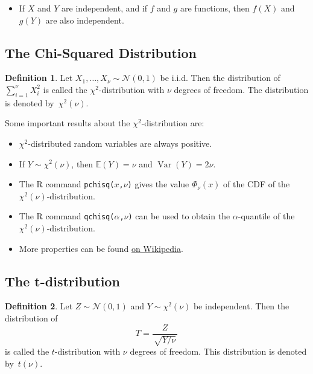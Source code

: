 \documentclass[
  a4paper,
]{article}
\providecommand{\tightlist}{%
  \setlength{\itemsep}{0pt}\setlength{\parskip}{0pt}}
\theoremstyle{definition}
\newtheorem{definition}{Definition}[section]
\theoremstyle{definition}
\theoremstyle{definition}
\theoremstyle{definition}
\theoremstyle{remark}
\begin{document}
\begin{itemize}
\tightlist
\item
  If \(X\) and \(Y\) are independent, and if \(f\) and \(g\) are functions,
  then \(f(X)\) and \(g(Y)\) are also independent.
\end{itemize}

\hypertarget{chi-square}{%
\subsection{The Chi-Squared Distribution}\label{chi-square}}

\begin{definition}
\protect\hypertarget{def:chi-squared-dist}{}\label{def:chi-squared-dist}Let \(X_1, \ldots, X_\nu \sim \mathcal{N}(0, 1)\) be i.i.d. Then the
distribution of \(\sum_{i=1}^\nu X_i^2\) is called the
\(\chi^2\)-distribution with \(\nu\) degrees of freedom. The
distribution is denoted by~\(\chi^2(\nu)\).
\end{definition}

Some important results about the \(\chi^2\)-distribution are:

\begin{itemize}
\item
  \(\chi^2\)-distributed random variables are always positive.
\item
  If \(Y\sim \chi^2(\nu)\), then \(\mathbb{E}(Y) = \nu\) and \(\mathop{\mathrm{Var}}(Y) = 2\nu\).
\item
  The R command \texttt{pchisq(\textbar{}}\(x\)\texttt{,}\(\nu\)\texttt{)} gives the value
  \(\Phi_\nu(x)\) of the CDF of the \(\chi^2(\nu)\)-distribution.
\item
  The R command \texttt{qchisq(}\(\alpha\)\texttt{,}\(\nu\)\texttt{)} can
  be used to obtain the
  \(\alpha\)-quantile of the \(\chi^2(\nu)\)-distribution.
\item
  More properties can be found
  \href{https://en.wikipedia.org/wiki/Chi-squared_distribution}{on Wikipedia}.
\end{itemize}

\hypertarget{t}{%
\subsection{The t-distribution}\label{t}}

\begin{definition}
\protect\hypertarget{def:t-dist}{}\label{def:t-dist}Let \(Z \sim \mathcal{N}(0,1)\) and \(Y \sim \chi^2(\nu)\) be independent. Then
the distribution of
\begin{equation}
  T
  = \frac{\,Z\,}{\,\sqrt{Y / \nu}\,}  \label{eq:t-def}
\end{equation}
is called the \(t\)-distribution with \(\nu\) degrees of freedom.
This distribution is denoted by~\(t(\nu)\).
\end{definition}
\end{document}
